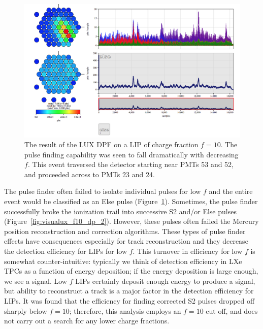\begin{figure}[htbp]
\begin{center}
\includegraphics[width=\textwidth]{figures/lips/visualux_f10_dp.png}
\caption{The result of the \acs{LUX} \acs{DPF} on a \acs{LIP} of charge fraction $f=10$. The pulse finding capability was seen to fall dramatically with decreasing $f$. This event traversed the detector starting near \acs{PMT}s 53 and 52, and proceeded across to \acs{PMT}s 23 and 24.}
\label{fig:visualux_f10_dp}
\end{center}
\end{figure}

The pulse finder often failed to isolate individual pulses for low $f$ and the entire event would be classified as an Else pulse (Figure~\ref{fig:visualux_f10_dp}). Sometimes, the pulse finder successfully broke the ionization trail into successive S2 and/or Else pulses (Figure~\ref{fig:visualux_f10_dp_2}). However, these pulses often failed the Mercury position reconstruction and correction algorithms. These types of pulse finder effects have consequences especially for track reconstruction and they decrease the detection efficiency for \ac{LIP}s for low $f$. This turnover in efficiency for low $f$ is somewhat counter-intuitive: typically we think of detection efficiency in \ac{LXe} \ac{TPC}s as a function of energy deposition; if the energy deposition is large enough, we see a signal. Low $f$ \ac{LIP}s certainly deposit enough energy to produce a signal, but ability to reconstruct a track is a major factor in the detection efficiency for \ac{LIP}s. It was found that the efficiency for finding corrected S2 pulses dropped off sharply below $f=10$; therefore, this analysis employs an $f=10$ cut off, and does not carry out a search for any lower charge fractions. 

